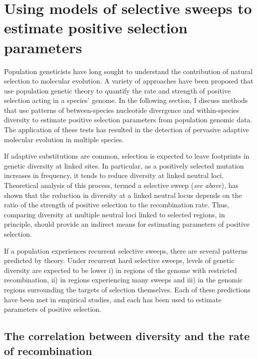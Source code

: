 \section[Using models of selective sweeps to estimate positive selection parameters]{Using models of selective sweeps to estimate positive selection parameters}
 
Population geneticists have long sought to understand the contribution of natural selection to molecular evolution. A variety of approaches have been proposed that use population genetic theory to quantify the rate and strength of positive selection acting in a species' genome. In the following section, I discuss methods that use patterns of between-species nucleotide divergence and within-species diversity to estimate positive selection parameters from population genomic data. The application of these tests has resulted in the detection of pervasive adaptive molecular evolution in multiple species.
 
If adaptive substitutions are common, selection is expected to leave footprints in genetic diversity at linked sites. In particular, as a positively selected mutation increases in frequency, it tends to reduce diversity at linked neutral loci. Theoretical analysis of this process, termed a selective sweep (\textit{see above}), has shown that the reduction in diversity at a linked neutral locus depends on the ratio of the strength of positive selection to the recombination rate. Thus, comparing diversity at multiple neutral loci linked to selected regions, in principle, should provide an indirect means for estimating parameters of positive selection.

If a population experiences recurrent selective sweeps, there are several patterns predicted by theory. Under recurrent hard selective sweeps, levels of genetic diversity are expected to be lower i) in regions of the genome with restricted recombination, ii) in regions experiencing many sweeps and iii) in the genomic regions surrounding the targets of selection themselves. Each of these predictions have been met in empirical studies, and each has been used to estimate parameters of positive selection.

\subsection[The correlation between diversity and the rate of recombination]{The correlation between diversity and the rate of recombination}

